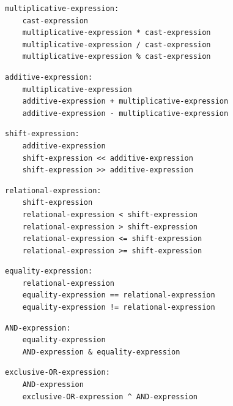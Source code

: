 \noindent\textbf{\texttt{}}\par
\begin{lstlisting}
multiplicative-expression:
    cast-expression
    multiplicative-expression * cast-expression
    multiplicative-expression / cast-expression
    multiplicative-expression % cast-expression
\end{lstlisting}

\noindent\textbf{\texttt{}}\par
\begin{lstlisting}
additive-expression:
    multiplicative-expression
    additive-expression + multiplicative-expression
    additive-expression - multiplicative-expression
\end{lstlisting}

\noindent\textbf{\texttt{}}\par
\begin{lstlisting}
shift-expression:
    additive-expression
    shift-expression << additive-expression
    shift-expression >> additive-expression
\end{lstlisting}

\noindent\textbf{\texttt{}}\par
\begin{lstlisting}
relational-expression:
    shift-expression
    relational-expression < shift-expression
    relational-expression > shift-expression
    relational-expression <= shift-expression
    relational-expression >= shift-expression
\end{lstlisting}

\noindent\textbf{\texttt{}}\par
\begin{lstlisting}
equality-expression:
    relational-expression
    equality-expression == relational-expression
    equality-expression != relational-expression
\end{lstlisting}

\noindent\textbf{\texttt{}}\par
\begin{lstlisting}
AND-expression:
    equality-expression
    AND-expression & equality-expression
\end{lstlisting}

\noindent\textbf{\texttt{}}\par
\begin{lstlisting}
exclusive-OR-expression:
    AND-expression
    exclusive-OR-expression ^ AND-expression
\end{lstlisting}

